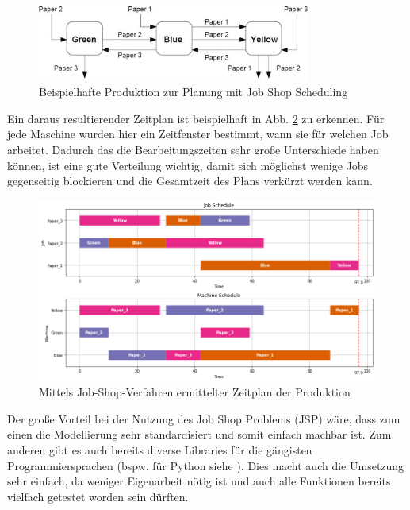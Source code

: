 \begin{figure}[H]
    \centering
    \includegraphics[width=0.8\textwidth]{images/jobshopdiagram.jpg}
    \caption{Beispielhafte Produktion zur Planung mit Job Shop Scheduling \cite{jobshop2}}
    \label{fig:job_shop_skizze}
\end{figure}

Ein daraus resultierender Zeitplan ist beispielhaft in Abb. \ref{fig:job_shop_schedule} zu erkennen. Für jede Maschine wurden hier ein Zeitfenster bestimmt, wann sie für welchen Job arbeitet. Dadurch das die Bearbeitungszeiten sehr große Unterschiede haben können, ist eine gute Verteilung wichtig, damit sich möglichst wenige Jobs gegenseitig blockieren und die Gesamtzeit des Plans verkürzt werden kann.

\begin{figure}[H]
    \centering
    \includegraphics[width=\textwidth]{images/jobshopdiagram_schedule.png}
    \caption{Mittels Job-Shop-Verfahren ermittelter Zeitplan der Produktion \cite{jobshop2}}
    \label{fig:job_shop_schedule}
\end{figure}

Der große Vorteil bei der Nutzung des Job Shop Problems (JSP) wäre, dass zum einen die Modellierung sehr standardisiert und somit einfach machbar ist. Zum anderen gibt es auch bereits diverse Libraries für die gängisten Programmiersprachen (bspw. für Python siehe \cite{jobshop2}). Dies macht auch die Umsetzung sehr einfach, da weniger Eigenarbeit nötig ist und auch alle Funktionen bereits vielfach getestet worden sein dürften.

